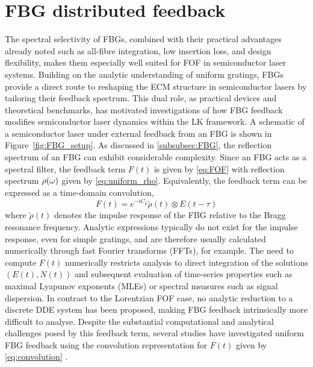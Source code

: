 \section*{FBG distributed feedback}
\label{sec:FBG_feedback}
%
The spectral selectivity of FBGs, combined with their practical advantages already noted such as all-fibre integration, low insertion loss, and design flexibility, makes them especially well suited for FOF in semiconductor laser systems.
Building on the analytic understanding of uniform gratings, FBGs provide a direct route to reshaping the ECM structure in semiconductor lasers by tailoring their feedback spectrum.
This dual role, as practical devices and theoretical benchmarks, has motivated investigations of how FBG feedback modifies semiconductor laser dynamics within the LK framework.
A schematic of a semiconductor laser under external feedback from an FBG is shown in Figure~\ref{fig:FBG_setup}.
As discussed in \ref{subsubsec:FBG}, the reflection spectrum of an FBG can exhibit considerable complexity.
Since an FBG acts as a spectral filter, the feedback term $F(t)$ is given by \eqref{eq:FOF} with reflection spectrum $\rho(\omega)$ given by \eqref{eq:uniform_rho}.
Equivalently, the feedback term can be expressed as a time-domain convolution,
%
\begin{equation}
    \label{eq:convolution}
     F(t) = e^{-i C_p} \tilde{\rho}(t) \otimes E(t-\tau)
\end{equation}
%
where $\tilde{\rho}(t)$ denotes the impulse response of the FBG relative to the Bragg resonance frequency.
Analytic expressions typically do not exist for the impulse response, even for simple gratings, and are therefore usually calculated numerically through fast Fourier transforms (FFTs), for example.
The need to compute $F(t)$ numerically restricts analysis to direct integration of the solutions $(E(t),N(t))$ and subsequent evaluation of time-series properties such as maximal Lyapunov exponents (MLEs) or spectral measures such as signal dispersion.
In contrast to the Lorentzian FOF case, no analytic reduction to a discrete DDE system has been proposed, making FBG feedback intrinsically more difficult to analyse.
Despite the substantial computational and analytical challenges posed by this feedback term, several studies have investigated uniform FBG feedback using the convolution representation for $F(t)$ given by \eqref{eq:convolution} \cite{li2012distributed, li2015chaotic, li2020stable, jiang2021characterizing, skenderas2021feedback, skenderas2024impact}.
%
\par
